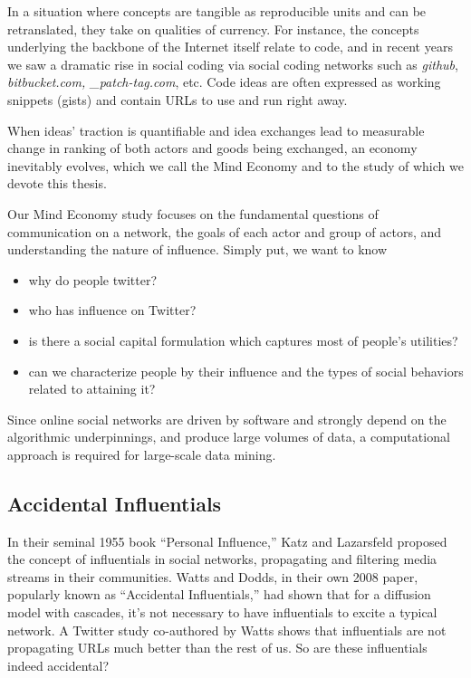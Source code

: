 \documentclass[10pt,oneside]{memoir}
\begin{document}
\begin{Spacing}{2}
In a situation where concepts are tangible as reproducible units and can be retranslated, they take on qualities of currency.  For instance, the concepts underlying the backbone of the Internet itself relate to code, and in recent years we saw a dramatic rise in social coding via social coding networks such as {\itshape github}, {\itshape bitbucket.com, \_patch-tag.com}, etc.  Code ideas are often expressed as working snippets (gists) and contain URLs to use and run right away.


When ideas' traction is quantifiable and idea exchanges lead to measurable change in ranking of both actors and goods being exchanged, an economy inevitably evolves, which we call the Mind Economy and to the study of which we devote this thesis.


Our Mind Economy study focuses on the fundamental questions of communication on a network, the goals of each actor and group of actors, and understanding the nature of influence.  Simply put, we want to know


\begin{itemize}


\item why do people twitter?

\item who has influence on Twitter? 

\item is there a social capital formulation which captures most of people's utilities?

\item can we characterize people by their influence and the types of social behaviors related to attaining it?
\end{itemize}

Since online social networks are driven by software and strongly depend on the algorithmic underpinnings, and produce large volumes of data, a computational approach is required for large-scale data mining.


\pagebreak \subsection{Accidental Influentials}
\label{accidentalinfluentials}

In their seminal 1955 book ``Personal Influence,'' Katz and Lazarsfeld \cite{katz1955influence} proposed the concept of influentials in social networks, propagating and filtering media streams in their communities.  Watts and Dodds, in their own 2008 paper, popularly known as ``Accidental Influentials,'' had shown that for a diffusion model with cascades, it's not necessary to have influentials to excite a typical network.  A Twitter study co-authored by Watts shows that influentials are not propagating URLs much better than the rest of us.  So are these influentials indeed accidental?



\end{Spacing}
\end{document}
